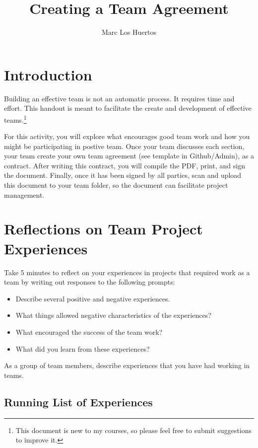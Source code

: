 \documentclass{article}\usepackage[]{graphicx}\usepackage[]{color}
\title{Creating a Team Agreement}
\author{Marc Los Huertos}
\begin{document}
\maketitle

\section{Introduction}

Building an effective team is not an automatic process. It requires time and effort. This handout is meant to facilitate the create and development of effective teams.\footnote{This document is new to my courses, so please feel free to submit suggestions to improve it.}

For this activity, you will explore what encourages good team work and how you might be participating in postive team. Once your team discusses each section, your team create your own team agreement (see template in Github/Admin), as a contract. After writing this contract, you will compile the PDF, print, and sign the document. Finally, once it has been signed by all parties, scan and upload this document to your team folder, so the document can facilitate project management.

\section{Reflections on Team Project Experiences}

Take 5 minutes to reflect on your experiences in projects that required work as a team by writing out responses to the following prompts:

\begin{itemize}
  \item Describe several positive and negative experiences.
  \item What things allowed negative characteristics of the experiences?
  \item What encouraged the success of the team work?
  \item What did you learn from these experiences?
\end{itemize}

As a group of team members, describe experiences that you have had working in teams. 

\subsection{Running List of Experiences}
\end{document}
